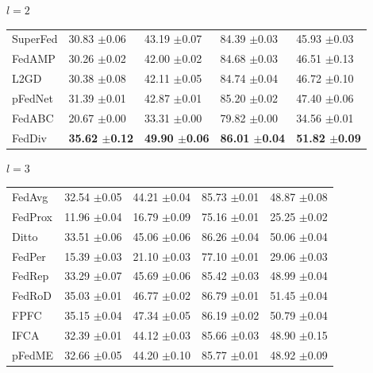 \documentclass[journal]{IEEEtran}
\begin{document}
\begin{table}
\begin{subtable}[]{$l=2$}
\begin{tabular}{@{}lllll@{}}
			SuperFed & 30.83 $\pm$0.06          & 43.19 $\pm$0.07          & 84.39 $\pm$0.03          & 45.93 $\pm$0.03          \\
			FedAMP   & 30.26 $\pm$0.02          & 42.00 $\pm$0.02          & 84.68 $\pm$0.03          & 46.51 $\pm$0.13          \\
			L2GD     & 30.38 $\pm$0.08          & 42.11 $\pm$0.05          & 84.74 $\pm$0.04          & 46.72 $\pm$0.10          \\
			pFedNet  & 31.39 $\pm$0.01          & 42.87 $\pm$0.01          & 85.20 $\pm$0.02          & 47.40 $\pm$0.06          \\
			FedABC   & 20.67 $\pm$0.00          & 33.31 $\pm$0.00          & 79.82 $\pm$0.00          & 34.56 $\pm$0.01          \\
			FedDiv   & \textbf{35.62 $\pm$0.12} & \textbf{49.90 $\pm$0.06} & \textbf{86.01 $\pm$0.04} & \textbf{51.82 $\pm$0.09} \\ \bottomrule
		\end{tabular}
	\end{subtable}
	\centering
	\begin{subtable}[]{$l=3$}
		\begin{tabular}{@{}lllll@{}}
			\specialrule{0em}{3pt}{1pt}
			\toprule
			FedAvg   & 32.54 $\pm$0.05          & 44.21 $\pm$0.04          & 85.73 $\pm$0.01          & 48.87 $\pm$0.08          \\
			FedProx  & 11.96 $\pm$0.04          & 16.79 $\pm$0.09          & 75.16 $\pm$0.01          & 25.25 $\pm$0.02          \\
			Ditto    & 33.51 $\pm$0.06          & 45.06 $\pm$0.06          & 86.26 $\pm$0.04          & 50.06 $\pm$0.04          \\
			FedPer   & 15.39 $\pm$0.03          & 21.10 $\pm$0.03          & 77.10 $\pm$0.01          & 29.06 $\pm$0.03          \\
			FedRep   & 33.29 $\pm$0.07          & 45.69 $\pm$0.06          & 85.42 $\pm$0.03          & 48.99 $\pm$0.04          \\
			FedRoD   & 35.03 $\pm$0.01          & 46.77 $\pm$0.02          & 86.79 $\pm$0.01          & 51.45 $\pm$0.04          \\
			FPFC     & 35.15 $\pm$0.04          & 47.34 $\pm$0.05          & 86.19 $\pm$0.02          & 50.79 $\pm$0.04          \\
			IFCA     & 32.39 $\pm$0.01          & 44.12 $\pm$0.03          & 85.66 $\pm$0.03          & 48.90 $\pm$0.15          \\
			pFedME   & 32.66 $\pm$0.05          & 44.20 $\pm$0.10          & 85.77 $\pm$0.01          & 48.92 $\pm$0.09          \\

\end{tabular}
\end{subtable}
\end{table}
\end{document}
